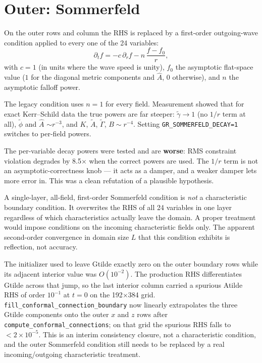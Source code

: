 \documentclass[11pt,openany]{book}
\newcommand{\ph}{\tilde{\phi}}
\newcommand{\At}{\tilde{A}}
\newcommand{\Gt}{\tilde{\Gamma}}
\newcommand{\etr}{\tilde{\gamma}}
\begin{document}
\section{Outer: Sommerfeld}

On the outer rows and column the RHS is replaced by a first-order outgoing-wave
condition applied to every one of the 24 variables:
\begin{equation}
\label{eq:sommerfeld}
\partial_t f = -c\,\partial_r f - n\,\frac{f - f_0}{r},
\end{equation}
with $c = 1$ (in units where the wave speed is unity), $f_0$ the asymptotic
flat-space value ($1$ for the diagonal metric components and $\hat{A}$, $0$
otherwise), and $n$ the asymptotic falloff power.

The legacy condition uses $n = 1$ for every field. Measurement showed that for
exact Kerr--Schild data the true powers are far steeper:
$\etr \to 1$ (no $1/r$ term at all), $\ph$ and $\hat{A}$ $\sim r^{-3}$, and $K$,
$\At$, $\Gt$, $B \sim r^{-4}$. Setting \texttt{GR\_SOMMERFELD\_DECAY=1}
switches to per-field powers.

\gotcha
The per-variable decay powers were tested and are \textbf{worse}: RMS
constraint violation degrades by 8.5$\times$ when the correct powers are used.
The $1/r$ term is not an asymptotic-correctness knob --- it acts as a damper,
and a weaker damper lets more error in. This was a clean refutation of a
plausible hypothesis.

\gotcha
A single-layer, all-field, first-order Sommerfeld condition is \emph{not} a
characteristic boundary condition. It overwrites the RHS of all 24 variables
in one layer regardless of which characteristics actually leave the domain.
A proper treatment would impose conditions on the incoming characteristic
fields only. The apparent second-order convergence in domain size $L$ that this
condition exhibits is reflection, not accuracy.

\gotcha
The initializer used to leave Gtilde exactly zero on the outer boundary rows
while its adjacent interior value was $O(10^{-2})$. The production RHS
differentiates Gtilde across that jump, so the last interior column carried a
spurious Atilde RHS of order $10^{-1}$ at $t=0$ on the 192$\times$384 grid.
\texttt{fill\_conformal\_connection\_boundary} now linearly extrapolates the
three Gtilde components onto the outer $x$ and $z$ rows after
\texttt{compute\_conformal\_connections}; on that grid the spurious RHS falls
to $<2\times10^{-5}$. This is an interim consistency closure, not a
characteristic condition, and the outer Sommerfeld condition still needs to be
replaced by a real incoming/outgoing characteristic treatment.
\end{document}
